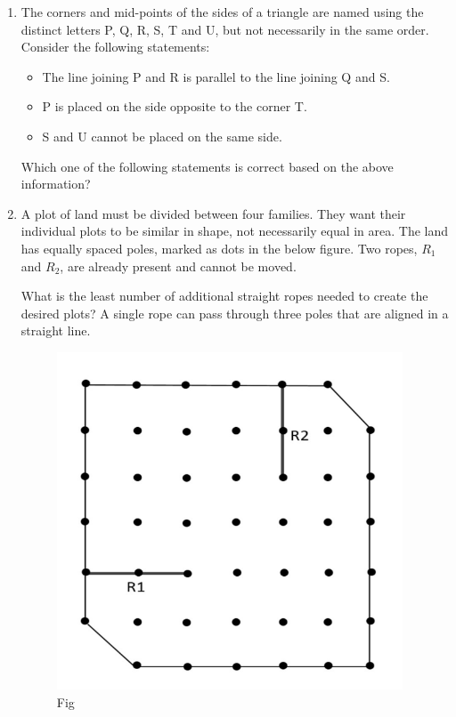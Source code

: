 \begin{enumerate}
\hfill{}

\item The corners and mid-points of the sides of a triangle are named using the distinct letters P, Q, R, S, T and U, but not necessarily in the same order. Consider the following statements:  

\begin{itemize}
\item The line joining P and R is parallel to the line joining Q and S.  
\item P is placed on the side opposite to the corner T.  
\item S and U cannot be placed on the same side.  
\end{itemize}

Which one of the following statements is correct based on the above information?  

\begin{enumerate}
\end{enumerate}

\hfill{}

\item A plot of land must be divided between four families. They want their individual plots to be similar in shape, not necessarily equal in area. The land has equally spaced poles, marked as dots in the below figure. Two ropes, $R_1$ and $R_2$, are already present and cannot be moved.  

What is the least number of additional straight ropes needed to create the desired plots? A single rope can pass through three poles that are aligned in a straight line. \begin{figure}[H]
\centering
\includegraphics[width=0.8\columnwidth]{figs/q10.png}
\caption{Fig}
\label{fig:q10}
\end{figure}


\end{enumerate}

